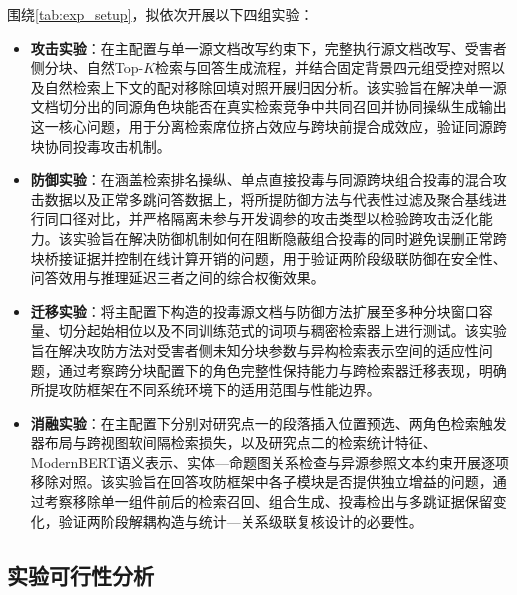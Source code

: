 
围绕\autoref{tab:exp_setup}，拟依次开展以下四组实验：
\begin{itemize}[leftmargin=2em,itemsep=2pt]
  \item \textbf{攻击实验}：在主配置与单一源文档改写约束下，完整执行源文档改写、受害者侧分块、自然Top-$K$检索与回答生成流程，并结合固定背景四元组受控对照以及自然检索上下文的配对移除回填对照开展归因分析。该实验旨在解决单一源文档切分出的同源角色块能否在真实检索竞争中共同召回并协同操纵生成输出这一核心问题，用于分离检索席位挤占效应与跨块前提合成效应，验证同源跨块协同投毒攻击机制。
  \item \textbf{防御实验}：在涵盖检索排名操纵、单点直接投毒与同源跨块组合投毒的混合攻击数据以及正常多跳问答数据上，将所提防御方法与代表性过滤及聚合基线进行同口径对比，并严格隔离未参与开发调参的攻击类型以检验跨攻击泛化能力。该实验旨在解决防御机制如何在阻断隐蔽组合投毒的同时避免误删正常跨块桥接证据并控制在线计算开销的问题，用于验证两阶段级联防御在安全性、问答效用与推理延迟三者之间的综合权衡效果。
  \item \textbf{迁移实验}：将主配置下构造的投毒源文档与防御方法扩展至多种分块窗口容量、切分起始相位以及不同训练范式的词项与稠密检索器上进行测试。该实验旨在解决攻防方法对受害者侧未知分块参数与异构检索表示空间的适应性问题，通过考察跨分块配置下的角色完整性保持能力与跨检索器迁移表现，明确所提攻防框架在不同系统环境下的适用范围与性能边界。
  \item \textbf{消融实验}：在主配置下分别对研究点一的段落插入位置预选、两角色检索触发器布局与跨视图软间隔检索损失，以及研究点二的检索统计特征、ModernBERT语义表示、实体—命题图关系检查与异源参照文本约束开展逐项移除对照。该实验旨在回答攻防框架中各子模块是否提供独立增益的问题，通过考察移除单一组件前后的检索召回、组合生成、投毒检出与多跳证据保留变化，验证两阶段解耦构造与统计—关系级联复核设计的必要性。
\end{itemize}

\subsection{实验可行性分析}

